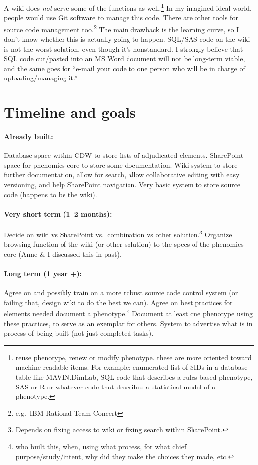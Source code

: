 \documentclass{tufte-handout}
\begin{document}
A wiki does \emph{not} serve some of the functions as
well.\footnote{reuse phenotype, renew or modify phenotype. these are
  more oriented toward machine-readable items. For example: enumerated
  list of SIDs in a database table like MAVIN.DimLab, SQL code that
  describes a rules-based phenotype, SAS or R or whatever code that
  describes a statistical model of a phenotype.} In my imagined ideal
world, people would use Git software to manage this code. There are
other tools for source code management too.\footnote{e.g.\ IBM
  Rational Team Concert} The main drawback is the learning curve, so I
don't know whether this is actually going to happen. SQL/SAS code on
the wiki is not the worst solution, even though it's nonstandard. I
strongly believe that SQL code cut/pasted into an MS Word document
will not be long-term viable, and the same goes for ``e-mail your code
to one person who will be in charge of uploading/managing it.''

\section{Timeline and goals}

\paragraph{Already built:} Database space within CDW to store lists
of adjudicated elements. SharePoint space for phenomics core to store
some documentation. Wiki system to store further documentation, allow
for search, allow collaborative editing with easy versioning, and help
SharePoint navigation. Very basic system to store source code (happens
to be the wiki).

\paragraph{Very short term (1--2 months):} Decide on wiki vs SharePoint
vs.\ combination vs other solution.\footnote{Depends on fixing access
  to wiki or fixing search within SharePoint.} Organize browsing
function of the wiki (or other solution) to the specs of the phenomics
core (Anne \& I discussed this in past).

\paragraph{Long term (1 year +):} Agree on and possibly train on a more
robust source code control system (or failing that, design wiki to do
the best we can). Agree on best practices for elements needed document
a phenotype.\footnote{who built this, when, using what process, for
  what chief purpose/study/intent, why did they make the choices they
  made, etc.} Document at least one phenotype using these practices,
to serve as an exemplar for others. System to advertise what is in
process of being built (not just completed tasks).
\end{document}
